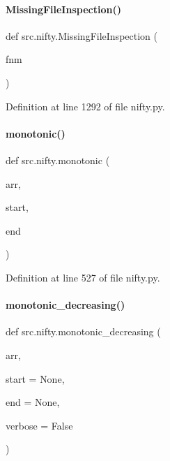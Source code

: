 \paragraph{\texorpdfstring{Missing\+File\+Inspection()}{MissingFileInspection()}}
{\footnotesize\ttfamily def src.\+nifty.\+Missing\+File\+Inspection (\begin{DoxyParamCaption}\item[{}]{fnm }\end{DoxyParamCaption})}



Definition at line 1292 of file nifty.\+py.

\mbox{\label{namespacesrc_1_1nifty_a376cc4e72c89cfca911b308ca185cdbf}} 
\paragraph{\texorpdfstring{monotonic()}{monotonic()}}
{\footnotesize\ttfamily def src.\+nifty.\+monotonic (\begin{DoxyParamCaption}\item[{}]{arr,  }\item[{}]{start,  }\item[{}]{end }\end{DoxyParamCaption})}



Definition at line 527 of file nifty.\+py.

\mbox{\label{namespacesrc_1_1nifty_a9e3f648d72235693254aa5cc5729441a}} 
\paragraph{\texorpdfstring{monotonic\+\_\+decreasing()}{monotonic\_decreasing()}}
{\footnotesize\ttfamily def src.\+nifty.\+monotonic\+\_\+decreasing (\begin{DoxyParamCaption}\item[{}]{arr,  }\item[{}]{start = {\ttfamily None},  }\item[{}]{end = {\ttfamily None},  }\item[{}]{verbose = {\ttfamily False} }\end{DoxyParamCaption})}



